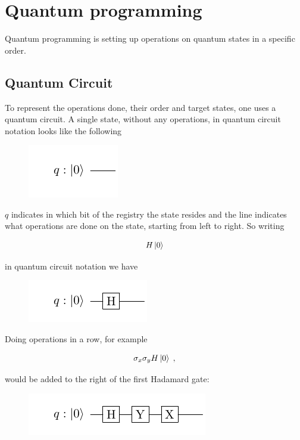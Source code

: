 \section{Quantum programming}

Quantum programming is setting up operations on quantum states in a specific order.

\subsection{Quantum Circuit}

To represent the operations done, their order and target states, one uses a quantum circuit. A single state, without any operations, in quantum circuit notation looks like the following

\begin{figure}[H]
    \centering
    \includegraphics{Figures/Circuits/Theory/basecircuit.pdf}
\end{figure}

$q$ indicates in which bit of the registry the state resides and the line indicates what operations are done on the state, starting from left to right. So writing

$$H \ket{0}$$

in quantum circuit notation we have

\begin{figure}[H]
    \centering
    \includegraphics{Figures/Circuits/Theory/Hbasecircuit.pdf}
\end{figure}


Doing operations in a row, for example

$$\sigma_x  \sigma_yH \ket{0} \; ,$$

would be added to the right of the first Hadamard gate:

\begin{figure}[H]
    \centering
    \includegraphics{Figures/Circuits/Theory/xyHbasecircuit.pdf}
\end{figure}

